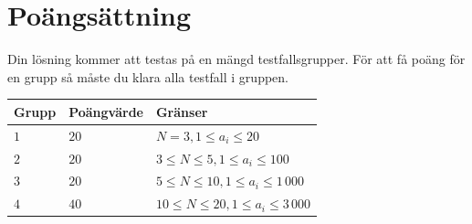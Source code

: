\section*{Poängsättning}
Din lösning kommer att testas på en mängd testfallsgrupper.
För att få poäng för en grupp så måste du klara alla testfall i gruppen.

\noindent
\begin{tabular}{| l | l | l |}
  \hline
  Grupp & Poängvärde & Gränser \\ \hline
  $1$   & $20$       & $N=3, 1 \leq a_i \leq 20$ \\ \hline
  $2$   & $20$       & $3 \leq N \leq 5, 1 \leq a_i \leq 100$ \\ \hline
  $3$   & $20$       & $5 \leq N \leq 10, 1 \leq a_i \leq 1\,000$ \\ \hline
  $4$   & $40$       & $10 \leq N \leq 20, 1 \leq a_i \leq 3\,000$ \\ \hline
\end{tabular}
